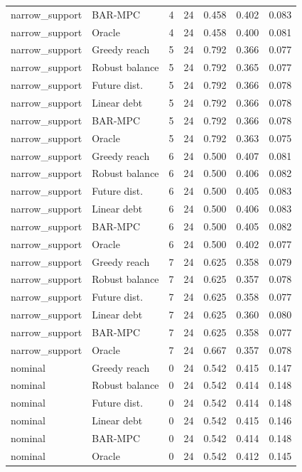 \begin{longtable}{llrrrrr}
narrow\_support & BAR-MPC & 4 & 24 & 0.458 & 0.402 & 0.083 \\
narrow\_support & Oracle & 4 & 24 & 0.458 & 0.400 & 0.081 \\
narrow\_support & Greedy reach & 5 & 24 & 0.792 & 0.366 & 0.077 \\
narrow\_support & Robust balance & 5 & 24 & 0.792 & 0.365 & 0.077 \\
narrow\_support & Future dist. & 5 & 24 & 0.792 & 0.366 & 0.078 \\
narrow\_support & Linear debt & 5 & 24 & 0.792 & 0.366 & 0.078 \\
narrow\_support & BAR-MPC & 5 & 24 & 0.792 & 0.366 & 0.078 \\
narrow\_support & Oracle & 5 & 24 & 0.792 & 0.363 & 0.075 \\
narrow\_support & Greedy reach & 6 & 24 & 0.500 & 0.407 & 0.081 \\
narrow\_support & Robust balance & 6 & 24 & 0.500 & 0.406 & 0.082 \\
narrow\_support & Future dist. & 6 & 24 & 0.500 & 0.405 & 0.083 \\
narrow\_support & Linear debt & 6 & 24 & 0.500 & 0.406 & 0.083 \\
narrow\_support & BAR-MPC & 6 & 24 & 0.500 & 0.405 & 0.082 \\
narrow\_support & Oracle & 6 & 24 & 0.500 & 0.402 & 0.077 \\
narrow\_support & Greedy reach & 7 & 24 & 0.625 & 0.358 & 0.079 \\
narrow\_support & Robust balance & 7 & 24 & 0.625 & 0.357 & 0.078 \\
narrow\_support & Future dist. & 7 & 24 & 0.625 & 0.358 & 0.077 \\
narrow\_support & Linear debt & 7 & 24 & 0.625 & 0.360 & 0.080 \\
narrow\_support & BAR-MPC & 7 & 24 & 0.625 & 0.358 & 0.077 \\
narrow\_support & Oracle & 7 & 24 & 0.667 & 0.357 & 0.078 \\
nominal & Greedy reach & 0 & 24 & 0.542 & 0.415 & 0.147 \\
nominal & Robust balance & 0 & 24 & 0.542 & 0.414 & 0.148 \\
nominal & Future dist. & 0 & 24 & 0.542 & 0.414 & 0.148 \\
nominal & Linear debt & 0 & 24 & 0.542 & 0.415 & 0.146 \\
nominal & BAR-MPC & 0 & 24 & 0.542 & 0.414 & 0.148 \\
nominal & Oracle & 0 & 24 & 0.542 & 0.412 & 0.145 \\

\end{longtable}
